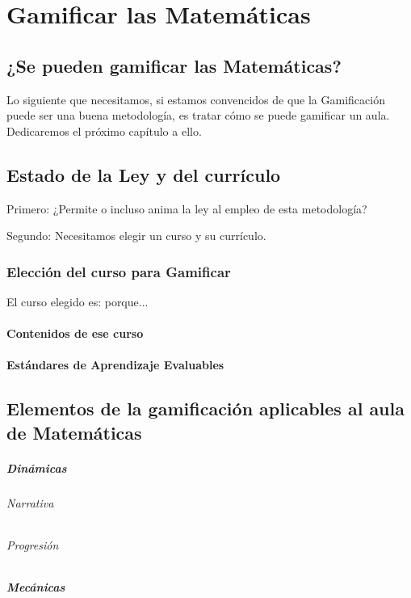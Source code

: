 \documentclass[a4paper, 12pt]{book}
\begin{document}
\cleardoublepage
\chapter{Gamificar las Matemáticas}

\section{¿Se pueden gamificar las Matemáticas?}

Lo siguiente que necesitamos, si estamos convencidos de que la Gamificación puede ser una buena metodología, es tratar cómo se puede gamificar un aula.
%
Dedicaremos el próximo capítulo a ello.

\section{Estado de la Ley y del currículo}

Primero: ¿Permite o incluso anima la ley al empleo de esta metodología?

Segundo: Necesitamos elegir un curso y su currículo.

\subsection{Elección del curso para Gamificar}

El curso elegido es: porque...

\subsubsection{Contenidos de ese curso}
\subsubsection{Estándares de Aprendizaje Evaluables}


\section{Elementos de la gamificación aplicables al aula de Matemáticas}

\paragraph{Dinámicas}

\subparagraph{Narrativa}
\subparagraph{Progresión}

\paragraph{Mecánicas}
\end{document}

